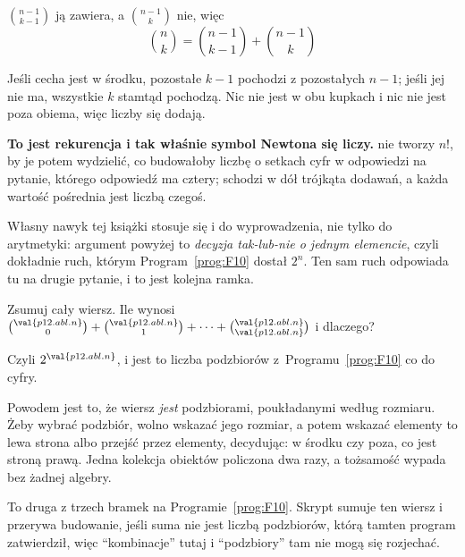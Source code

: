 \begin{fr}
\begin{ansblock}
$\binom{n-1}{k-1}$ ją zawiera, a $\binom{n-1}{k}$ nie, więc
\[ \binom{n}{k} = \binom{n-1}{k-1} + \binom{n-1}{k} \]
\end{ansblock}

Jeśli cecha jest w środku, pozostałe $k-1$ pochodzi z pozostałych $n-1$; jeśli
jej nie ma, wszystkie $k$ stamtąd pochodzą. Nic nie jest w obu kupkach i nic
nie jest poza obiema, więc liczby się dodają.

\textbf{To jest rekurencja i tak właśnie symbol Newtona się liczy.}
 nie tworzy $n!$, by je potem wydzielić, co budowałoby liczbę
o setkach cyfr w odpowiedzi na pytanie, którego odpowiedź ma cztery; schodzi w
dół trójkąta dodawań, a każda wartość pośrednia jest liczbą czegoś.

Własny nawyk tej książki stosuje się i do wyprowadzenia, nie tylko do
arytmetyki: argument powyżej to \emph{decyzja tak-lub-nie o jednym elemencie},
czyli dokładnie ruch, którym Program~\ref{prog:F10} dostał $2^{n}$. Ten sam
ruch odpowiada tu na drugie pytanie, i to jest kolejna ramka.
\end{fr}

\begin{fr}
Zsumuj cały wiersz. Ile wynosi
$\binom{\val{p12.abl.n}}{0} + \binom{\val{p12.abl.n}}{1} + \cdots +
\binom{\val{p12.abl.n}}{\val{p12.abl.n}}$ i dlaczego?
\dotline
\nextframe
\end{fr}

\begin{fr}
Czyli $2^{\val{p12.abl.n}}$, i jest to liczba podzbiorów
z~Programu~\ref{prog:F10} co do cyfry.

Powodem jest to, że wiersz \emph{jest} podzbiorami, poukładanymi według
rozmiaru. Żeby wybrać podzbiór, wolno wskazać jego rozmiar, a potem wskazać
elementy \dash{} to lewa strona \dash{} albo przejść przez elementy,
decydując: w środku czy poza, co jest stroną prawą. Jedna kolekcja obiektów
policzona dwa razy, a tożsamość wypada bez żadnej algebry.

\begin{note}
To druga z trzech bramek na Programie~\ref{prog:F10}. Skrypt sumuje ten wiersz
i przerywa budowanie, jeśli suma nie jest liczbą podzbiorów, którą tamten
program zatwierdził, więc \enquote{kombinacje} tutaj i \enquote{podzbiory}
tam nie mogą się rozjechać.
\end{note}
\end{fr}


